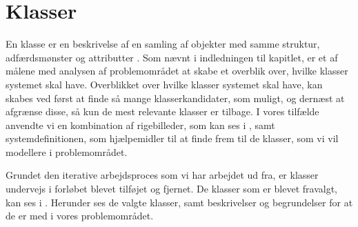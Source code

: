 \section{Klasser}
\label{sec:klasser}

En klasse er en beskrivelse af en samling af objekter med samme struktur, adfærdsmønster og attributter \cite[s. ~51]{ooad}. Som nævnt i indledningen til kapitlet, er et af målene med analysen af problemområdet at skabe et overblik over, hvilke klasser systemet skal have. Overblikket over hvilke klasser systemet skal have, kan skabes ved først at finde så mange klasserkandidater, som muligt, og dernæst at afgrænse disse, så kun de mest relevante klasser er tilbage. I vores tilfælde anvendte vi en kombination af rigebilleder, som kan ses i , samt systemdefinitionen, som hjælpemidler til at finde frem til de klasser, som vi vil modellere i problemområdet.

Grundet den iterative arbejdsproces som vi har arbejdet ud fra, er klasser undervejs i forløbet blevet tilføjet og fjernet. De klasser som er blevet fravalgt, kan ses i . Herunder ses de valgte klasser, samt beskrivelser og begrundelser for at de er med i vores problemområdet.

